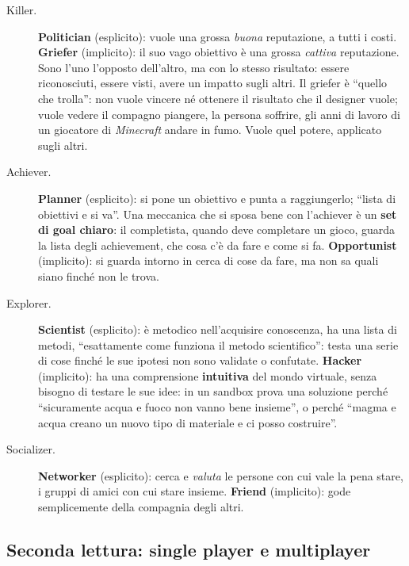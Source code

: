 \begin{description}
  \item[Killer.] \textbf{Politician} (esplicito): vuole una grossa
        \emph{buona} reputazione, a tutti i costi. \textbf{Griefer} (implicito): il
        suo vago obiettivo è una grossa \emph{cattiva} reputazione. Sono l'uno
        l'opposto dell'altro, ma con lo stesso risultato: essere riconosciuti, essere
        visti, avere un impatto sugli altri. Il griefer è ``quello che trolla'': non
        vuole vincere né ottenere il risultato che il designer vuole; vuole vedere il
        compagno piangere, la persona soffrire, gli anni di lavoro di un giocatore di
        \emph{Minecraft} andare in fumo. Vuole quel potere, applicato sugli altri.
  \item[Achiever.] \textbf{Planner} (esplicito): si pone un obiettivo e punta a
        raggiungerlo; ``lista di obiettivi e si va''. Una meccanica che si sposa bene
        con l'achiever è un \textbf{set di goal chiaro}: il completista, quando deve
        completare un gioco, guarda la lista degli achievement, che cosa c'è da fare e
        come si fa. \textbf{Opportunist} (implicito): si guarda intorno in cerca di
        cose da fare, ma non sa quali siano finché non le trova.
  \item[Explorer.] \textbf{Scientist} (esplicito): è metodico nell'acquisire
        conoscenza, ha una lista di metodi, ``esattamente come funziona il metodo
        scientifico'': testa una serie di cose finché le sue ipotesi non sono
        validate o confutate. \textbf{Hacker} (implicito): ha una comprensione
        \textbf{intuitiva} del mondo virtuale, senza bisogno di testare le sue idee:
        in un sandbox prova una soluzione perché ``sicuramente acqua e fuoco non vanno
        bene insieme'', o perché ``magma e acqua creano un nuovo tipo di materiale e
        ci posso costruire''.
  \item[Socializer.] \textbf{Networker} (esplicito): cerca e \emph{valuta} le
        persone con cui vale la pena stare, i gruppi di amici con cui stare insieme.
        \textbf{Friend} (implicito): gode semplicemente della compagnia degli altri.
\end{description}


\subsection{Seconda lettura: single player e multiplayer}

